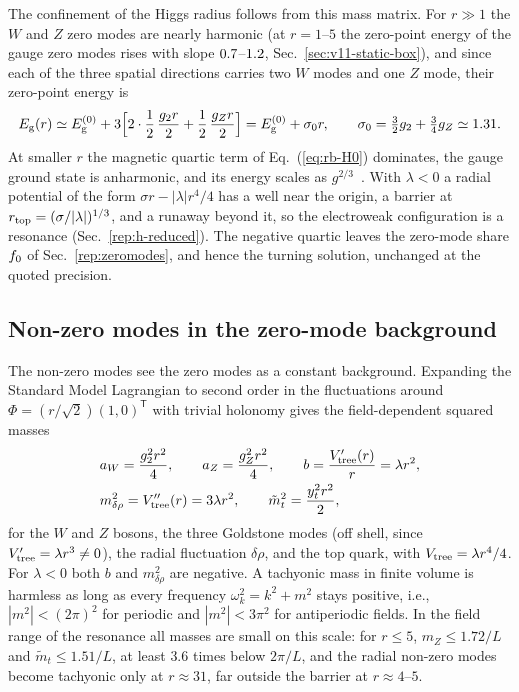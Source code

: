 The confinement of the Higgs radius follows from this mass matrix.
For $r\gg1$ the $W$ and $Z$ zero modes are nearly harmonic (at $r=1$--$5$ the zero-point energy of the gauge zero modes rises with slope $0.7$--$1.2$, Sec.~\ref{sec:v11-static-box}), and since each of the three spatial directions carries two $W$ modes and one $Z$ mode, their zero-point energy is %
\begin{equation}
E_{\rm g}(r)\simeq E_{\rm g}^{(0)}+3\Bigl[2\cdot\frac12\,\frac{g_2r}{2}+\frac12\,\frac{g_Zr}{2}\Bigr]=E_{\rm g}^{(0)}+\sigma_0 r,\qquad \sigma_0=\tfrac32 g_2+\tfrac34 g_Z\simeq1.31. %
\label{eq:rb-linear}
\end{equation}
At smaller $r$ the magnetic quartic term of Eq.~(\ref{eq:rb-H0}) dominates, the gauge ground state is anharmonic, and its energy scales as $g^{2/3}$~\cite{Luscher:1982ma,Koller:1987fq}.
With $\lambda<0$ a radial potential of the form $\sigma r-|\lambda|r^4/4$ has a well near the origin, a barrier at $r_{\rm top}=(\sigma/|\lambda|)^{1/3}$, and a runaway beyond it, so the electroweak configuration is a resonance (Sec.~\ref{rep:h-reduced}).
The negative quartic leaves the zero-mode share $f_0$ of Sec.~\ref{rep:zeromodes}, and hence the turning solution, unchanged at the quoted precision.

\subsection{Non-zero modes in the zero-mode background}
\label{sec:rb-masses}

The non-zero modes see the zero modes as a constant background.
Expanding the Standard Model Lagrangian to second order in the fluctuations around $\Phi=(r/\sqrt2)(1,0)^{\mathsf T}$ with trivial holonomy gives the field-dependent squared masses
\begin{align}
&a_W=\frac{g_2^2r^2}{4},\qquad a_Z=\frac{g_Z^2r^2}{4},\qquad b=\frac{V_{\rm tree}'(r)}{r}=\lambda r^2,\nonumber\\
&m_{\delta\rho}^2=V_{\rm tree}''(r)=3\lambda r^2,\qquad \tilde m_t^2=\frac{y_t^2r^2}{2},
\label{eq:rb-masses}
\end{align}
for the $W$ and $Z$ bosons, the three Goldstone modes (off shell, since $V'_{\rm tree}=\lambda r^3\neq0$), the radial fluctuation $\delta\rho$, and the top quark, with $V_{\rm tree}=\lambda r^4/4$.
For $\lambda<0$ both $b$ and $m_{\delta\rho}^2$ are negative.
A tachyonic mass in finite volume is harmless as long as every frequency $\omega_k^2=k^2+m^2$ stays positive, i.e., $|m^2|<(2\pi)^2$ for periodic and $|m^2|<3\pi^2$ for antiperiodic fields.
In the field range of the resonance all masses are small on this scale: for $r\le5$, $m_Z\le1.72/L$ and $\tilde m_t\le1.51/L$, at least $3.6$ times below $2\pi/L$, and the radial non-zero modes become tachyonic only at $r\approx31$, far outside the barrier at $r\approx4$--$5$. %

